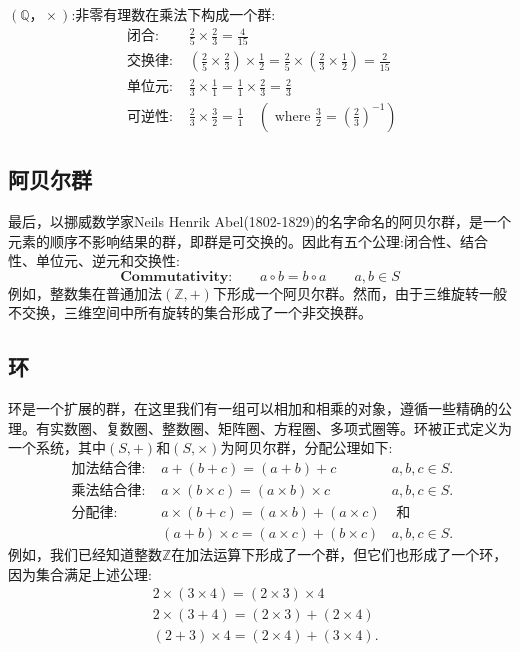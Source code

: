 $(\mathbb{Q}， \times)$:非零有理数在乘法下构成一个群:
$$
\begin{aligned}
\text { 闭合: } & \frac{2}{5} \times \frac{2}{3}=\frac{4}{15} \\
\text { 交换律: } & \left(\frac{2}{5} \times \frac{2}{3}\right) \times \frac{1}{2}=\frac{2}{5} \times\left(\frac{2}{3} \times \frac{1}{2}\right)=\frac{2}{15} \\
\text { 单位元: } & \frac{2}{3} \times \frac{1}{1}=\frac{1}{1} \times \frac{2}{3}=\frac{2}{3} \\
\text { 可逆性: } & \frac{2}{3} \times \frac{3}{2}=\frac{1}{1} \quad\left(\text { where } \frac{3}{2}=\left(\frac{2}{3}\right)^{-1}\right)
\end{aligned}
$$

\subsection{阿贝尔群}
最后，以挪威数学家Neils Henrik Abel(1802-1829)的名字命名的阿贝尔群，是一个元素的顺序不影响结果的群，即群是可交换的。因此有五个公理:闭合性、结合性、单位元、逆元和交换性:
$$
\textbf{Commutativity:} \qquad a \circ b=b \circ a \qquad a, b \in S
$$
例如，整数集在普通加法$(\mathbb{Z},+)$下形成一个阿贝尔群。然而，由于三维旋转一般不交换，三维空间中所有旋转的集合形成了一个非交换群。

\subsection{环}
环是一个扩展的群，在这里我们有一组可以相加和相乘的对象，遵循一些精确的公理。有实数圈、复数圈、整数圈、矩阵圈、方程圈、多项式圈等。环被正式定义为一个系统，其中$(S,+)$和$(S, \times)$为阿贝尔群，分配公理如下:
$$
\begin{array}{lll}
\textbf { 加法结合律: } & a+(b+c)=(a+b)+c & a, b, c \in S . \\
\textbf { 乘法结合律: } & a \times(b \times c)=(a \times b) \times c & a, b, c \in S . \\
\textbf { 分配律: } & a \times(b+c)=(a \times b)+(a \times c) & \text { 和 } \\
& (a+b) \times c=(a \times c)+(b \times c) & a, b, c \in S .
\end{array}
$$
例如，我们已经知道整数$\mathbb{Z}$在加法运算下形成了一个群，但它们也形成了一个环，因为集合满足上述公理:
$$
\begin{aligned}
& 2 \times(3 \times 4)=(2 \times 3) \times 4 \\
& 2 \times(3+4)=(2 \times 3)+(2 \times 4) \\
& (2+3) \times 4=(2 \times 4)+(3 \times 4) .
\end{aligned}
$$

